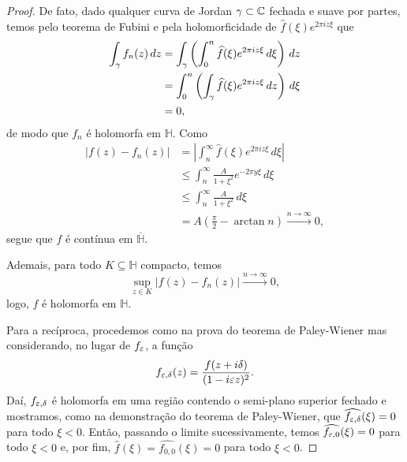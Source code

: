 \begin{proof}
            De fato, dado qualquer curva de Jordan 
            $\gamma\subset\mathbb{C}$ fechada
            e suave por partes, temos pelo teorema de Fubini e pela
            holomorficidade de $\widehat{f}(\xi)e^{2\pi iz\xi}$ que
            \begin{align*}
                \int_{\gamma} f_n(z) \, dz 
                &= \int_{\gamma}\left(\int_0^n 
                    \widehat{f}(\xi)e^{2\pi iz\xi} \, d\xi \right) 
                    \, dz \\
                &= \int_0^n \left(\int_{\gamma} 
                    \widehat{f}(\xi)e^{2\pi iz\xi} \, dz \right)
                    \, d\xi \\
                &= 0,
            \end{align*}
            de modo que $f_n$ é holomorfa em $\mathbb{H}$.
            Como
            \begin{align*}
                |f(z) - f_n(z)| 
                &= \left| \int_n^{\infty} 
                \widehat{f}(\xi)e^{2\pi iz\xi} \, d\xi \right| \\
                &\leq \int_n^{\infty} \frac{A}{1+\xi^2}e^{-2\pi y\xi}
                \, d\xi \\
                &\leq \int_n^{\infty} \frac{A}{1+\xi^2}\, d\xi \\
                &= A\left( \frac{\pi}{2} - \arctan n \right)
                \xrightarrow{n\to\infty} 0,
            \end{align*}
            segue que $f$ é contínua em $\overline{\mathbb{H}}$.
            
            Ademais, para todo $K\subseteq\mathbb{H}$ compacto,
            temos
            \begin{equation*}
                \sup_{z\in K} |f(z) - f_n(z)| 
                \xrightarrow{n\to\infty} 0,
            \end{equation*}
            logo, $f$ é holomorfa em $\mathbb{H}$.
            
            Para a recíproca, procedemos como na prova do teorema
            de Paley-Wiener mas considerando, no lugar de $f_{\varepsilon}$,
            a função
            \begin{equation*}
                f_{\varepsilon, \delta}(z) = \frac{f(z+i\delta)}{(1-i\varepsilon z)^2}.
            \end{equation*}
            Daí, $f_{\varepsilon, \delta}$ é holomorfa em uma região contendo o semi-plano
            superior fechado e mostramos, como na demonstração do teorema de 
            Paley-Wiener, que $\widehat{f_{\varepsilon, \delta}}(\xi) = 0$ para todo
            $\xi < 0$. Então, passando o limite sucessivamente, temos
            $\widehat{f_{\varepsilon,0}} (\xi) = 0$ para todo $\xi < 0$ e,
            por fim, $\widehat{f}(\xi) = \widehat{f_{0,0}} (\xi) = 0$ para todo $\xi < 0$.
        \end{proof}
        
    